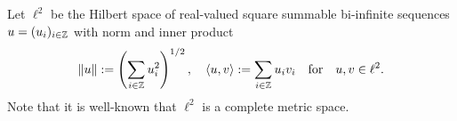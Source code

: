 \documentclass[11pt]{beamer}
\begin{document}
\begin{frame}
    \begin{definition}
        Let $\ell^2$ be the Hilbert space of real-valued square summable bi-infinite sequences
        $\mathnormal{u} = (u_i)_{i \in \mathbb{Z}}$ with norm and inner product
        \[
        \|\mathnormal{u}\| := \left( \sum_{i \in \mathbb{Z}} u_i^2 \right)^{1/2}, \quad \langle \mathnormal{u}, \mathnormal{v} \rangle := \sum_{i \in \mathbb{Z}} u_i v_i \quad \text{for} \quad \mathnormal{u}, \mathnormal{v} \in \ell^2.
        \]
        Note that it is well-known that $\ell^2$ is a complete metric space.
        

    \end{definition}
    
\end{frame}

\end{document}
